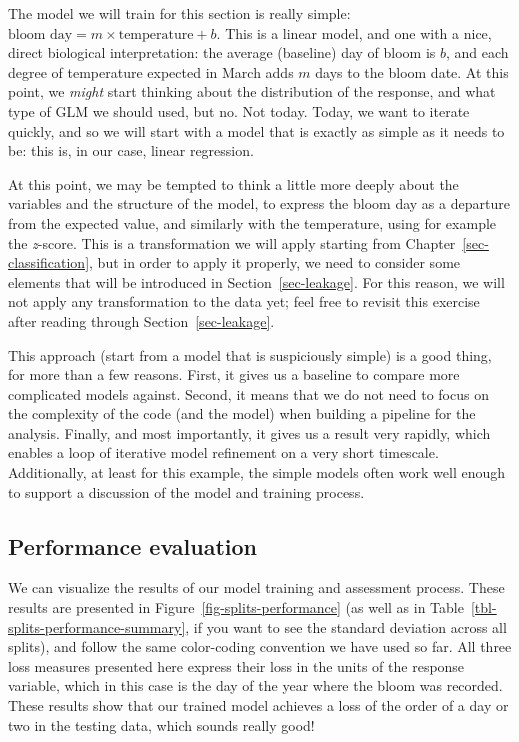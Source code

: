 \documentclass[
  letterpaper,
]{scrbook}
\begin{document}
The model we will train for this section is really simple:
\(\text{bloom day} = m \times \text{temperature} + b\). This is a linear
model, and one with a nice, direct biological interpretation: the
average (baseline) day of bloom is \(b\), and each degree of temperature
expected in March adds \(m\) days to the bloom date. At this point, we
\emph{might} start thinking about the distribution of the response, and
what type of GLM we should used, but no. Not today. Today, we want to
iterate quickly, and so we will start with a model that is exactly as
simple as it needs to be: this is, in our case, linear regression.

At this point, we may be tempted to think a little more deeply about the
variables and the structure of the model, to express the bloom day as a
departure from the expected value, and similarly with the temperature,
using for example the \emph{z}-score. This is a transformation we will
apply starting from Chapter~\ref{sec-classification}, but in order to
apply it properly, we need to consider some elements that will be
introduced in Section~\ref{sec-leakage}. For this reason, we will not
apply any transformation to the data yet; feel free to revisit this
exercise after reading through Section~\ref{sec-leakage}.

This approach (start from a model that is suspiciously simple) is a good
thing, for more than a few reasons. First, it gives us a baseline to
compare more complicated models against. Second, it means that we do not
need to focus on the complexity of the code (and the model) when
building a pipeline for the analysis. Finally, and most importantly, it
gives us a result very rapidly, which enables a loop of iterative model
refinement on a very short timescale. Additionally, at least for this
example, the simple models often work well enough to support a
discussion of the model and training process.

\subsection{Performance evaluation}\label{performance-evaluation}

We can visualize the results of our model training and assessment
process. These results are presented in
Figure~\ref{fig-splits-performance} (as well as in
Table~\ref{tbl-splits-performance-summary}, if you want to see the
standard deviation across all splits), and follow the same color-coding
convention we have used so far. All three loss measures presented here
express their loss in the units of the response variable, which in this
case is the day of the year where the bloom was recorded. These results
show that our trained model achieves a loss of the order of a day or two
in the testing data, which sounds really good!
\end{document}
